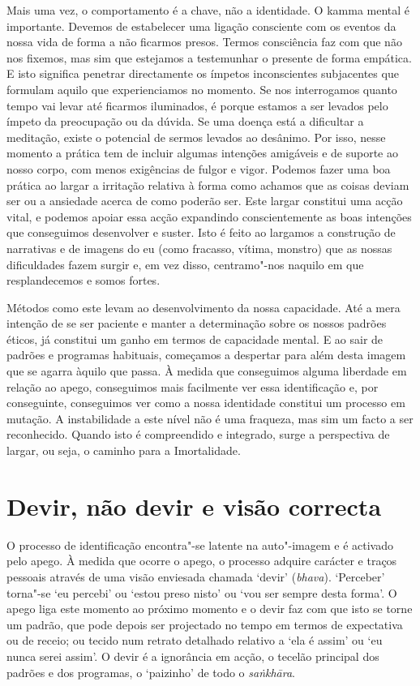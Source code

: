 Mais uma vez, o comportamento é a chave, não a identidade. O kamma mental é
importante. Devemos de estabelecer uma ligação consciente com os eventos da
nossa vida de forma a não ficarmos presos. Termos consciência faz com que não
nos fixemos, mas sim que estejamos a testemunhar o presente de forma empática. E
isto significa penetrar directamente os ímpetos inconscientes subjacentes que
formulam aquilo que experienciamos no momento. Se nos interrogamos quanto tempo
vai levar até ficarmos iluminados, é porque estamos a ser levados pelo ímpeto da
preocupação ou da dúvida. Se uma doença está a dificultar a meditação, existe o
potencial de sermos levados ao desânimo. Por isso, nesse momento a prática tem
de incluir algumas intenções amigáveis e de suporte ao nosso corpo, com menos
exigências de fulgor e vigor. Podemos fazer uma boa prática ao largar a
irritação relativa à forma como achamos que as coisas deviam ser ou a ansiedade
acerca de como poderão ser. Este largar constitui uma acção vital, e podemos
apoiar essa acção expandindo conscientemente as boas intenções que conseguimos
desenvolver e suster. Isto é feito ao largamos a construção de narrativas e de
imagens do eu (como fracasso, vítima, monstro) que as nossas dificuldades fazem
surgir e, em vez disso, centramo"-nos naquilo em que resplandecemos e somos
fortes.

Métodos como este levam ao desenvolvimento da nossa capacidade. Até a mera
intenção de se ser paciente e manter a determinação sobre os nossos padrões
éticos, já constitui um ganho em termos de capacidade mental. E ao sair de
padrões e programas habituais, começamos a despertar para além desta imagem que
se agarra àquilo que passa. À medida que conseguimos alguma liberdade em relação
ao apego, conseguimos mais facilmente ver essa identificação e, por conseguinte,
conseguimos ver como a nossa identidade constitui um processo em mutação. A
instabilidade a este nível não é uma fraqueza, mas sim um facto a ser
reconhecido. Quando isto é compreendido e integrado, surge a perspectiva de
largar, ou seja, o caminho para a Imortalidade.

\section{Devir, não devir e visão correcta}

O processo de identificação encontra"-se latente na auto"-imagem e é activado
pelo apego. À medida que ocorre o apego, o processo adquire carácter e traços
pessoais através de uma visão enviesada chamada `devir' (\emph{bhava}).
`Perceber' torna"-se `eu percebi' ou `estou preso nisto' ou `vou ser sempre
desta forma'. O apego liga este momento ao próximo momento e o devir faz com que
isto se torne um padrão, que pode depois ser projectado no tempo em termos de
expectativa ou de receio; ou tecido num retrato detalhado relativo a `ela é
assim' ou `eu nunca serei assim'. O devir é a ignorância em acção, o tecelão
principal dos padrões e dos programas, o `paizinho' de todo o \emph{saṅkhāra}.

